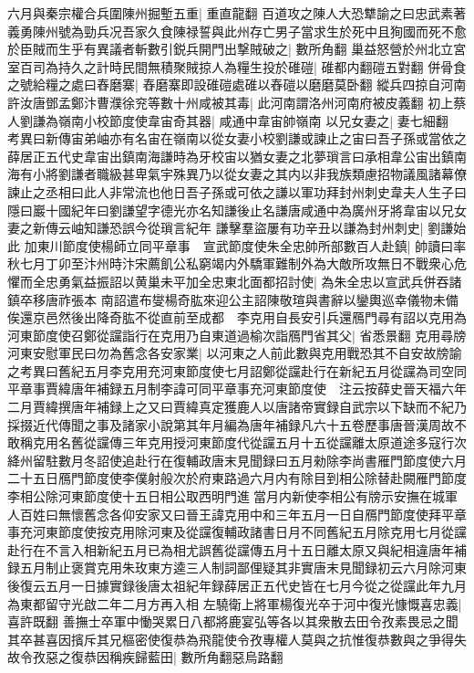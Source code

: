 六月與秦宗權合兵圍陳州掘塹五重|{
	重直龍翻}
百道攻之陳人大恐犨諭之曰忠武素著義勇陳州號為勁兵况吾家久食陳禄誓與此州存亡男子當求生於死中且狥國而死不愈於臣賊而生乎有異議者斬數引鋭兵開門出撃賊破之|{
	數所角翻}
巢益怒營於州北立宮室百司為持久之計時民間無積聚賊掠人為糧生投於碓磑|{
	碓都内翻磑五對翻}
併骨食之號給糧之處曰舂磨寨|{
	舂磨寨即設碓磑處碓以舂磑以磨磨莫卧翻}
縱兵四掠自河南許汝唐鄧孟鄭汴曹濮徐兖等數十州咸被其毒|{
	此河南謂洛州河南府被皮義翻}
初上蔡人劉謙為嶺南小校節度使韋宙奇其器|{
	咸通中韋宙帥嶺南}
以兄女妻之|{
	妻七細翻　考異曰新傳宙弟岫亦有名宙在嶺南以從女妻小校劉謙或諫止之宙曰吾子孫或當依之薛居正五代史韋宙出鎮南海謙時為牙校宙以猶女妻之北夢瑣言曰承相韋公宙出鎮南海有小將劉謙者職級甚卑氣宇殊異乃以從女妻之其内以非我族類慮招物議風諸幕僚諫止之丞相曰此人非常流也他日吾子孫或可依之謙以軍功拜封州刺史韋夫人生子曰隱曰巖十國紀年曰劉謙望字德光亦名知謙後止名謙唐咸通中為廣州牙將韋宙以兄女妻之新傳云岫知謙恐誤今從瑣言紀年}
謙擊羣盜屢有功辛丑以謙為封州刺史|{
	劉謙始此}
加東川節度使楊師立同平章事　宣武節度使朱全忠帥所部數百人赴鎮|{
	帥讀曰率}
秋七月丁卯至汴州時汴宋薦飢公私窮竭内外驕軍難制外為大敵所攻無日不戰衆心危懼而全忠勇氣益振詔以黄巢未平加全忠東北面都招討使|{
	為朱全忠以宣武兵併吞諸鎮卒移唐祚張本}
南詔遣布燮楊奇肱來迎公主詔陳敬瑄與書辭以鑾輿巡幸儀物未備俟還京邑然後出降奇肱不從直前至成都　李克用自長安引兵還鴈門尋有詔以克用為河東節度使召鄭從讜詣行在克用乃自東道過榆次詣鴈門省其父|{
	省悉景翻}
克用尋牓河東安慰軍民曰勿為舊念各安家業|{
	以河東之人前此數與克用戰恐其不自安故牓諭之考異曰舊紀五月李克用充河東節度使七月詔鄭從讜赴行在新紀五月從讜為司空同平章事賈緯唐年補録五月制李諱可同平章事充河東節度使　注云按薛史晉天福六年二月賈緯撰唐年補録上之又曰賈緯真定獲鹿人以唐諸帝實録自武宗以下缺而不紀乃採掇近代傳聞之事及諸家小說第其年月編為唐年補録凡六十五卷歷事唐晉漢周故不敢稱克用名舊從讜傳三年克用授河東節度代從讜五月十五從讜離太原道途多寇行次絳州留駐數月冬詔使追赴行在復輔政唐末見聞録曰五月勑除李尚書雁門節度使六月二十五日鴈門節度使李僕射般次於府東路過六月内有除目到相公除替赴闕雁門節度李相公除河東節度使十五日相公取西明門進當月内新使李相公有牓示安撫在城軍人百姓曰無懷舊念各仰安家又曰晉王諱克用中和三年五月一日自鴈門節度使拜平章事充河東節度使按克用除河東及從讜復輔政諸書日月不同舊紀五月除克用七月從讜赴行在不言入相新紀五月已為相尤誤舊從讜傳五月十五日離太原又與紀相違唐年補録五月制止褒賞克用朱玫東方逵三人制詞鄙俚疑其非實唐末見聞録初云六月除河東後復云五月一日據實録後唐太祖紀年録薛居正五代史皆在七月今從之從讜此年九月為東都留守光啟二年二月方再入相}
左驍衛上將軍楊復光卒于河中復光慷慨喜忠義|{
	喜許既翻}
善撫士卒軍中慟哭累日八都將鹿宴弘等各以其衆散去田令孜素畏忌之聞其卒甚喜因擯斥其兄樞密使復恭為飛龍使令孜專權人莫與之抗惟復恭數與之爭得失故令孜惡之復恭因稱疾歸藍田|{
	數所角翻惡烏路翻}
